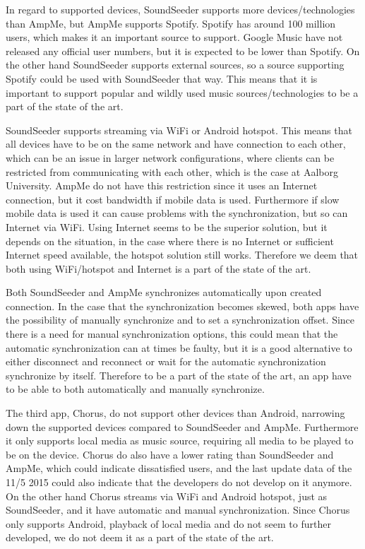 In regard to supported devices, SoundSeeder supports more devices/technologies than AmpMe, but AmpMe supports Spotify.
Spotify has around 100 million users, which makes it an important source to support\cite{spotify_subscribers}.
Google Music have not released any official user numbers, but it is expected to be lower than Spotify\cite{googlem_subscribers}.
On the other hand SoundSeeder supports external sources, so a source supporting Spotify could be used with SoundSeeder that way.
This means that it is important to support popular and wildly used music sources/technologies to be a part of the state of the art.

SoundSeeder supports streaming via WiFi or Android hotspot. 
This means that all devices have to be on the same network and have connection to each other,
which can be an issue in larger network configurations, where clients can be restricted from communicating with each other,
which is the case at Aalborg University.
AmpMe do not have this restriction since it uses an Internet connection, but it cost bandwidth if mobile data is used.
Furthermore if slow mobile data is used it can cause problems with the synchronization, but so can Internet via WiFi. 
Using Internet seems to be the superior solution, but it depends on the situation,
in the case where there is no Internet or sufficient Internet speed available, the hotspot solution still works. 
Therefore we deem that both using WiFi/hotspot and Internet is a part of the state of the art.

Both SoundSeeder and AmpMe synchronizes automatically upon created connection.
In the case that the synchronization becomes skewed, both apps have the possibility of manually synchronize and to set a synchronization offset.
Since there is a need for manual synchronization options, this could mean that the automatic synchronization can at times be faulty,
but it is a good alternative to either disconnect and reconnect or wait for the automatic synchronization synchronize by itself.
Therefore to be a part of the state of the art, an app have to be able to both automatically and manually synchronize. 

The third app, Chorus, do not support other devices than Android, narrowing down the supported devices compared to SoundSeeder and AmpMe.
Furthermore it only supports local media as music source, requiring all media to be played to be on the device. 
Chorus do also have a lower rating than SoundSeeder and AmpMe, which could indicate dissatisfied users,
and the last update data of the 11/5 2015 could also indicate that the developers do not develop on it anymore. 
On the other hand Chorus streams via WiFi and Android hotspot, just as SoundSeeder, and it have automatic and manual synchronization.
Since Chorus only supports Android, playback of local media and do not seem to further developed,
we do not deem it as a part of the state of the art.

